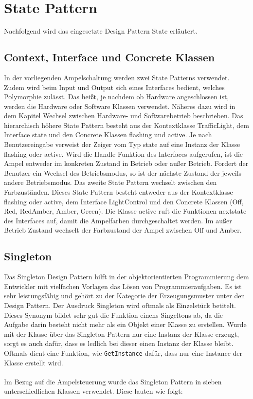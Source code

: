 \chapter{State Pattern}
Nachfolgend wird das eingesetzte Design Pattern State erläutert.
\section{Context, Interface und Concrete Klassen}
In der vorliegenden Ampelschaltung werden zwei State Patterns verwendet. Zudem wird beim Input und Output sich eines Interfaces bedient, welches Polymorphie zulässt. Das heißt, je nachdem ob Hardware angeschlossen ist, werden die Hardware oder Software Klassen verwendet. Näheres dazu wird in dem Kapitel \glqq Wechsel zwischen Hardware- und Softwarebetrieb\grqq{} beschrieben. Das hierarchisch höhere State Pattern besteht aus der Kontextklasse \glqq TrafficLight\grqq{}, dem Interface \glqq state\grqq{} und den Concrete Klassen \glqq flashing\grqq{} und \glqq active\grqq{}. Je nach Benutzereingabe verweist der Zeiger vom Typ \glqq state\grqq{} auf eine Instanz der Klasse \glqq flashing\grqq{} oder \glqq active\grqq{}. Wird die Handle Funktion des Interfaces aufgerufen, ist die Ampel entweder im konkreten Zustand \glqq in Betrieb\grqq{} oder \glqq außer Betrieb\grqq{}. Fordert der Benutzer ein Wechsel des Betriebsmodus, so ist der nächste Zustand der jeweils andere Betriebsmodus. Das zweite State Pattern wechselt zwischen den Farbzuständen. Dieses State Pattern besteht entweder aus der Kontextklasse \glqq flashing\grqq{} oder \glqq active\grqq{}, dem Interface \glqq LightControl\grqq{} und den Concrete Klassen (\glqq Off\grqq{}, \glqq Red\grqq{}, \glqq RedAmber\grqq{}, \glqq Amber\grqq{},  \glqq Green\grqq{}). Die Klasse  \glqq active\grqq{} ruft die Funktionen \glqq nextstate\grqq{} des Interfaces auf, damit die Ampelfarben durchgeschaltet werden. Im außer Betrieb Zustand wechselt der Farbzustand der Ampel zwischen Off und Amber.

\section{Singleton}
Das Singleton Design Pattern hilft in der objektorientierten Programmierung dem Entwickler mit vielfachen Vorlagen das Lösen von Programmieraufgaben. Es ist sehr leistungsfähig und gehört zu der Kategorie der Erzeugungsmuster unter den Design Pattern. Der Ausdruck Singleton wird oftmals als \glqq Einzelstück\grqq{} betitelt. Dieses Synonym bildet sehr gut die Funktion einens Singeltons ab, da die Aufgabe darin besteht nicht mehr als ein Objekt einer Klasse zu erstellen. Wurde mit der Klasse über das Singleton Pattern nur eine Instanz der Klasse erzeugt, sorgt es auch dafür, dass es ledlich bei dieser einen Instanz der Klasse bleibt. Oftmals dient eine Funktion, wie \texttt{GetInstance} dafür, dass nur eine Instance der Klasse erstellt wird.\\
\\
Im Bezug auf die Ampelsteuerung wurde das Singleton Pattern in sieben unterschiedlichen Klassen verwendet. Diese lauten wie folgt:

